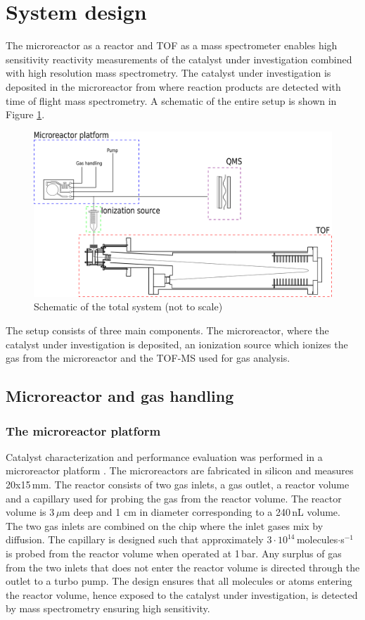 \documentclass[aip,rsi]{revtex4-1}
\begin{document}
\section{System design}
The microreactor as a reactor and TOF as a mass spectrometer enables high sensitivity reactivity measurements of the catalyst under investigation combined with high resolution mass spectrometry. The catalyst under investigation is deposited in the microreactor from where reaction products are detected with time of flight mass spectrometry. A schematic of the entire setup is shown in Figure \ref{fig:TOF_microreactor}.
\begin{figure}
 \includegraphics[width=14cm]{TOF_microreactor.png}%
 \caption{Schematic of the total system (not to scale)\label{fig:TOF_microreactor}}%
\end{figure}
The setup consists of three main components. The microreactor, where the catalyst under investigation is deposited, an ionization source which ionizes the gas from the microreactor and the TOF-MS used for gas analysis. 

\subsection{Microreactor and gas handling}

\subsubsection{The microreactor platform}
Catalyst characterization and performance evaluation was performed in a microreactor platform \cite{Henriksen2009}. The microreactors are fabricated in silicon and measures 20x15\,mm. The reactor consists of two gas inlets, a gas outlet, a reactor volume and a capillary used for probing the gas from the reactor volume. The reactor volume is 3\,$\mu$m deep and 1 cm in diameter corresponding to a 240\,nL volume. The two gas inlets are combined on the chip where the inlet gases mix by diffusion. The capillary is designed such that approximately $3\cdot10^{14}$\,molecules$\cdot$s$^{-1}$ is probed from the reactor volume when operated at 1\,bar. Any surplus of gas from the two inlets that does not enter the reactor volume is directed through the outlet to a turbo pump. The design ensures that all molecules or atoms entering the reactor volume, hence exposed to the catalyst under investigation, is detected by mass spectrometry ensuring high sensitivity.
\end{document}
